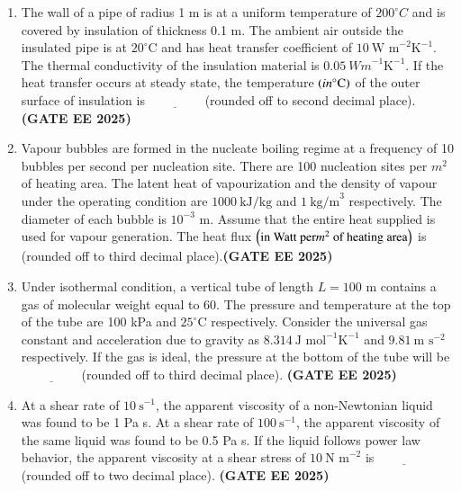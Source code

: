 \documentclass[journal,12pt,onecolumn]{IEEEtran}
\theoremstyle{remark}
\begin{document}
\begin{enumerate}
\item The wall of a pipe of radius 1 m is at a uniform temperature of $200^{\circ}C$ and is covered by insulation of thickness 0.1 m. The ambient air outside the insulated pipe is at $20^{\circ}\text{C}$ and has heat transfer coefficient of $10~\text{W m}^{-2}\text{K}^{-1}$. The thermal conductivity of the insulation material is $0.05~{W m}^{-1}\text{K}^{-1}$. If the heat transfer occurs at steady state, the temperature $\brak{in {}^{\circ}\text{C}}$ of the outer surface of insulation is$\underline{\hspace{2cm}}$(rounded off to second decimal place).\hfill \textbf{(GATE EE 2025)}



\item  Vapour bubbles are formed in the nucleate boiling regime at a frequency of 10 bubbles per second per nucleation site. There are 100 nucleation sites per $m^2$ of heating area. The latent heat of vapourization and the density of vapour under the operating condition are $1000~\text{kJ/kg}$ and $1~\text{kg/m}^{3}$ respectively. The diameter of each bubble is $10^{-3}$ m. Assume that the entire heat supplied is used for vapour generation. The heat flux $\brak{\text{in Watt per} {m}^{2} \text{ of heating area}}$ is (rounded off to third decimal place).\hfill \textbf{(GATE EE 2025)}



\item Under isothermal condition, a vertical tube of length $L=100$ m contains a gas of molecular weight equal to 60. The pressure and temperature at the top of the tube are 100 kPa and $25^{\circ}\text{C}$ respectively. Consider the universal gas constant and acceleration due to gravity as $8.314~\text{J mol}^{-1}\text{K}^{-1}$ and $9.81~\text{m s}^{-2}$ respectively. If the gas is ideal, the pressure  at the bottom of the tube will be$\underline{\hspace{2cm}}$(rounded off to third decimal place). \hfill \textbf{(GATE EE 2025)} 



\item At a shear rate of $10~\text{s}^{-1}$, the apparent viscosity of a non-Newtonian liquid was found to be 1 Pa s. At a shear rate of $100~\text{s}^{-1}$, the apparent viscosity of the same liquid was found to be 0.5 Pa s. If the liquid follows power law behavior, the apparent viscosity  at a shear stress of $10~\text{N m}^{-2}$ is$\underline{\hspace{2cm}}$(rounded off to two decimal place). \hfill \textbf{(GATE EE 2025)} 




\end{enumerate}
\end{document}
